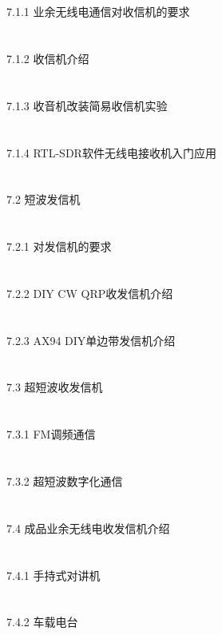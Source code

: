 \documentclass[12pt,UTF8]{ctexbook}
\begin{document}
\section{}7.1.1 业余无线电通信对收信机的要求
\section{}7.1.2 收信机介绍
\section{}7.1.3 收音机改装简易收信机实验
\section{}7.1.4 RTL-SDR软件无线电接收机入门应用
\section{}7.2 短波发信机
\section{}7.2.1 对发信机的要求
\section{}7.2.2 DIY CW QRP收发信机介绍
\section{}7.2.3 AX94 DIY单边带发信机介绍
\section{}7.3 超短波收发信机
\section{}7.3.1 FM调频通信
\section{}7.3.2 超短波数字化通信
\section{}7.4 成品业余无线电收发信机介绍
\section{}7.4.1 手持式对讲机
\section{}7.4.2 车载电台
\end{document}
